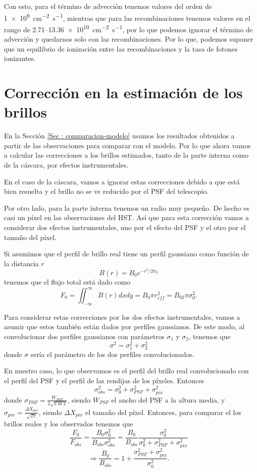 \documentclass{book}
\begin{document}
Con esto, para el término de advección tenemos valores del orden de \SI{1e9}{cm^{-2}.s^{-1}}, mientras que para las recombinaciones tenemos valores en el rango de 2.71--\SI{13.36e10}{cm^{-2}.s^{-1}}, por lo que podemos ignorar el término de advección y quedarnos solo con las recombinaciones. Por lo que, podemos suponer que un equilibrio de ionización entre las recombinaciones y la tasa de fotones ionizantes.

\chapter{Corrección en la estimación de los brillos}

En la Sección \ref{Sec : comparacion-modelo} usamos los resultados obtenidos a partir de las observaciones para comparar con el modelo. Por lo que ahora vamos a calcular las correcciones a los brillos estimados, tanto de la parte interna como de la cáscara, por efectos instrumentales.

En el caso de la cáscara, vamos a ignorar estas correcciones debido a que está bien resuelta y  el brillo no se ve reducido por el PSF del telescopio.

Por otro lado, para la parte interna tenemos un radio muy pequeño. De hecho es casi un píxel en las observaciones del HST. Así que para esta corrección vamos a considerar dos efectos instrumentales, uno por el efecto del PSF y el otro por el tamaño del píxel.

Si asumimos que el perfil de brillo real tiene un perfil gaussiano como función de la distancia $r$ \[B(r)= B_0 e^{-r^2/2\sigma_0}\] tenemos que el flujo total está dado como \[F_0=\iint_{-\infty}^\infty B(r)dxdy=B_0 \pi r_{eff}^2=B_02\pi \sigma_0^2.\]

Para considerar estas correcciones por los dos efectos instrumentales, vamos a asumir que estos también están dados por perfiles gaussianos. De este modo, al convolucionar dos perfiles gaussianos con parámetros $\sigma_1$ y $\sigma_2$, tenemos que \[\sigma^2=\sigma_1^2+\sigma_2^2\] donde $\sigma$ sería el parámetro de los dos perfiles convolucionados.

En nuestro caso, lo que observamos es el perfil del brillo real convolucionado con el perfil del PSF y el perfil de las rendijas de los píxeles. Entonces \[\sigma_{obs}^2=\sigma_0^2+\sigma_{PSF}^2+\sigma_{pix}^2\] donde $\sigma_{PSF}=\frac{W_{PSF}}{2\sqrt{2\ln{2}}}$, siendo $W_{PSF}$ el ancho del PSF a la altura media, y $\sigma_{pix}=\frac{\Delta X_{pix}}{\sqrt{2\pi}}$, siendo $\Delta X_{pix}$ el tamaño del píxel. Entonces, para comparar el los brillos reales y los observados tenemos que
\[\frac{F_0}{F_{obs}}=\frac{B_0\sigma_0^2}{B_{obs}\sigma_{obs}^2}=\frac{B_0}{B_{obs}}\frac{\sigma_0^2}{\sigma_0^2+\sigma_{PSF}^2+\sigma_{pix}^2}\] 
\[\Rightarrow \frac{B_0}{B_{obs}}=1+\frac{\sigma_{PSF}^2+\sigma_{pix}^2}{\sigma_0^2}.\]
\end{document}
